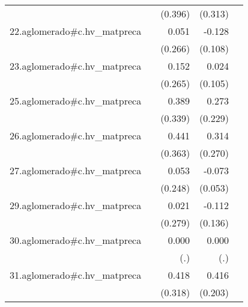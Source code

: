 {\begin{longtable}{l*{4}{D{.}{.}{-1}}}
            &                     &     (0.396)         &     (0.313)         &                     \\
\addlinespace
22.aglomerado#c.hv\_matpreca&                     &       0.051         &      -0.128         &                     \\
            &                     &     (0.266)         &     (0.108)         &                     \\
\addlinespace
23.aglomerado#c.hv\_matpreca&                     &       0.152         &       0.024         &                     \\
            &                     &     (0.265)         &     (0.105)         &                     \\
\addlinespace
25.aglomerado#c.hv\_matpreca&                     &       0.389         &       0.273         &                     \\
            &                     &     (0.339)         &     (0.229)         &                     \\
\addlinespace
26.aglomerado#c.hv\_matpreca&                     &       0.441         &       0.314         &                     \\
            &                     &     (0.363)         &     (0.270)         &                     \\
\addlinespace
27.aglomerado#c.hv\_matpreca&                     &       0.053         &      -0.073         &                     \\
            &                     &     (0.248)         &     (0.053)         &                     \\
\addlinespace
29.aglomerado#c.hv\_matpreca&                     &       0.021         &      -0.112         &                     \\
            &                     &     (0.279)         &     (0.136)         &                     \\
\addlinespace
30.aglomerado#c.hv\_matpreca&                     &       0.000         &       0.000         &                     \\
            &                     &         (.)         &         (.)         &                     \\
\addlinespace
31.aglomerado#c.hv\_matpreca&                     &       0.418         &       0.416\sym{*}  &                     \\
            &                     &     (0.318)         &     (0.203)         &                     \\

\end{longtable}}
